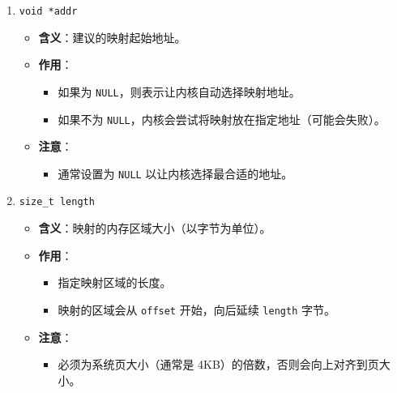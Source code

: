\begin{enumerate}
    \item \texttt{void *addr}
    \begin{itemize}
        \item \textbf{含义}：建议的映射起始地址。
        \item \textbf{作用}：
        \begin{itemize}
            \item 如果为 \texttt{NULL}，则表示让内核自动选择映射地址。
            \item 如果不为 \texttt{NULL}，内核会尝试将映射放在指定地址（可能会失败）。
        \end{itemize}
        \item \textbf{注意}：
        \begin{itemize}
            \item 通常设置为 \texttt{NULL} 以让内核选择最合适的地址。
        \end{itemize}
    \end{itemize}

    \item \texttt{size\_t length}
    \begin{itemize}
        \item \textbf{含义}：映射的内存区域大小（以字节为单位）。
        \item \textbf{作用}：
        \begin{itemize}
            \item 指定映射区域的长度。
            \item 映射的区域会从 \texttt{offset} 开始，向后延续 \texttt{length} 字节。
        \end{itemize}
        \item \textbf{注意}：
        \begin{itemize}
            \item 必须为系统页大小（通常是 4KB）的倍数，否则会向上对齐到页大小。
        \end{itemize}
    \end{itemize}


\end{enumerate}
